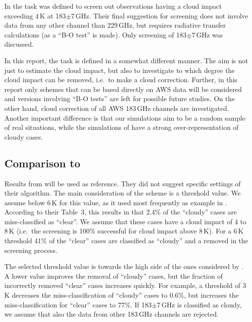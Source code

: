 \documentclass[12pt]{article}
\begin{document}
In \citet{rekha2012potential} the task was defined to screen out observations
having a cloud impact exceeding 4\,K at 183$\pm$7\,GHz. Their final suggestion
for screening does not involve data from any other channel than 229\,GHz, but
requires radiative transfer calculations (as a ``B-O test'' is made). Only 
screening of 183$\pm$7\,GHz was discussed.

In this report, the task is defined in a somewhat different manner. The aim is
not just to estimate the cloud impact, but also to investigate to which degree
the cloud impact can be removed, i.e.\ to make a cloud correction. Further, in
this report only schemes that can be based directly on AWS data will be
considered and versions involving ``B-O tests'' are left for possible future
studies. On the other hand, cloud correction of all AWS 183\,GHz channels are
investigated. Another important difference is that our simulations aim to be a
random sample of real situations, while the simulations of
\citet{rekha2012potential} have a strong over-representation of cloudy
cases.



\subsection{Comparison to \citet{rekha2012potential}}
\label{sec:rekha}
%
Results from \citet{rekha2012potential} will be used as reference. They did not
suggest specific settings of their algorithm. The main consideration of the
scheme is a threshold value. We assume below 6\,K for
this value, as it used most frequently as example in
\citet{rekha2012potential}. According to their Table~3, this results in that
2.4\% of the ``cloudy'' cases are miss-classified as ``clear''. We assume that
these cases have a cloud impact of 4 to 8\,K (i.e.\ the screening is 100\%
successful for cloud impact above 8\,K). For a 6\,K threshold 41\% of the
``clear'' cases are classified as ``cloudy'' and a removed in the screening
process. 

The selected threshold value is towards the high side of the ones considered by 
\citet{rekha2012potential}. A lower value improves the removal of ``cloudy'' cases,
but the fraction of incorrectly removed ``clear'' cases increases quickly. For
example, a threshold of 3\,K decreases the miss-classification of ``cloudy''
cases to 0.6\%, but increases the miss-classification for ``clear'' cases to 77\%.
If 183$\pm$7\,GHz is classified as cloudy, we assume that also the data from
other 183\,GHz channels are rejected.
\end{document}
